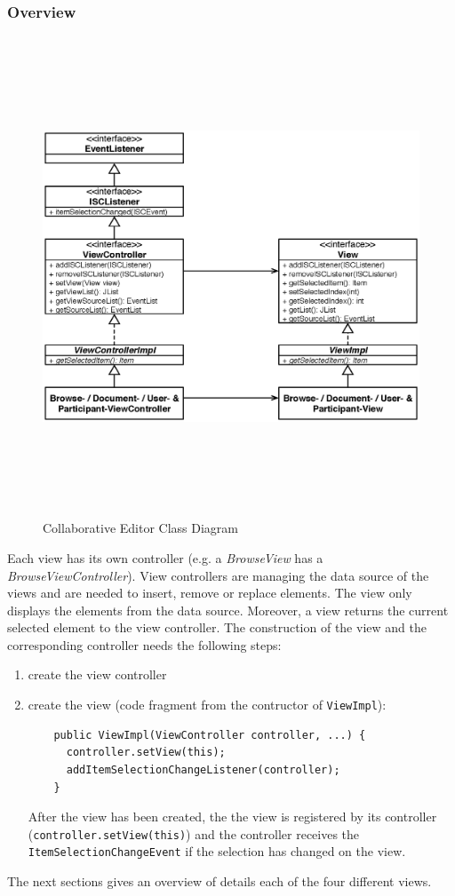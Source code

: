 \subsubsection{Overview}
\begin{figure}[H]
\begin{center}
  \includegraphics[height=5.62in, width=7.19in]{../images/finalreport/application_views_controllers.eps}
\caption{Collaborative Editor Class Diagram}
\label{application_views_controllers}
\end{center}
\end{figure}
Each view has its own controller (e.g. a \textit{BrowseView} has a \textit{BrowseViewController}). View controllers are managing the data source of the views and are needed to insert, remove or replace elements. The view only displays the elements from the data source. Moreover, a view returns the current selected element to the view controller. The construction of the view and the corresponding controller needs the following steps:
\begin{enumerate}
\item create the view controller
\item create the view (code fragment from the contructor of \texttt{ViewImpl}):
  \begin{verbatim}
    public ViewImpl(ViewController controller, ...) {
      controller.setView(this);
      addItemSelectionChangeListener(controller);
    }
  \end{verbatim}
  After the view has been created, the the view is registered by its controller (\texttt{controller.setView(this)}) and the controller receives the \texttt{ItemSelectionChangeEvent} if the selection has changed on the view.
\end{enumerate}
The next sections gives an overview of details each of the four different views.


